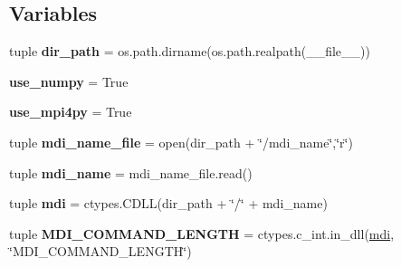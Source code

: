 \subsection*{Variables}
\begin{DoxyCompactItemize}
\item 
\hypertarget{namespacemolssi__driver__interface_1_1mdi_a659f7f2c2dad27268542893627dddd76}{tuple {\bfseries dir\-\_\-path} = os.\-path.\-dirname(os.\-path.\-realpath(\-\_\-\-\_\-file\-\_\-\-\_\-))}\label{namespacemolssi__driver__interface_1_1mdi_a659f7f2c2dad27268542893627dddd76}

\item 
\hypertarget{namespacemolssi__driver__interface_1_1mdi_ab641655ae2e8ddbbf84bea8e8e5bf953}{{\bfseries use\-\_\-numpy} = True}\label{namespacemolssi__driver__interface_1_1mdi_ab641655ae2e8ddbbf84bea8e8e5bf953}

\item 
\hypertarget{namespacemolssi__driver__interface_1_1mdi_a2d2043c182591fed4963dbcb9cf30484}{{\bfseries use\-\_\-mpi4py} = True}\label{namespacemolssi__driver__interface_1_1mdi_a2d2043c182591fed4963dbcb9cf30484}

\item 
\hypertarget{namespacemolssi__driver__interface_1_1mdi_ab47fd48619ba8e2bfe10f6d86d5be1b5}{tuple {\bfseries mdi\-\_\-name\-\_\-file} = open(dir\-\_\-path + \char`\"{}/mdi\-\_\-name\char`\"{},\char`\"{}r\char`\"{})}\label{namespacemolssi__driver__interface_1_1mdi_ab47fd48619ba8e2bfe10f6d86d5be1b5}

\item 
\hypertarget{namespacemolssi__driver__interface_1_1mdi_afc7bde19c202368b68fce956fdbc9035}{tuple {\bfseries mdi\-\_\-name} = mdi\-\_\-name\-\_\-file.\-read()}\label{namespacemolssi__driver__interface_1_1mdi_afc7bde19c202368b68fce956fdbc9035}

\item 
\hypertarget{namespacemolssi__driver__interface_1_1mdi_a57cb628499747477003d54de706ab429}{tuple {\bfseries mdi} = ctypes.\-C\-D\-L\-L(dir\-\_\-path + \char`\"{}/\char`\"{} + mdi\-\_\-name)}\label{namespacemolssi__driver__interface_1_1mdi_a57cb628499747477003d54de706ab429}

\item 
\hypertarget{namespacemolssi__driver__interface_1_1mdi_aa92fd47513f406f91b87c70b9dd221c6}{tuple {\bfseries M\-D\-I\-\_\-\-C\-O\-M\-M\-A\-N\-D\-\_\-\-L\-E\-N\-G\-T\-H} = ctypes.\-c\-\_\-int.\-in\-\_\-dll(\hyperlink{classmdi}{mdi}, \char`\"{}M\-D\-I\-\_\-\-C\-O\-M\-M\-A\-N\-D\-\_\-\-L\-E\-N\-G\-T\-H\char`\"{})}\label{namespacemolssi__driver__interface_1_1mdi_aa92fd47513f406f91b87c70b9dd221c6}


\end{DoxyCompactItemize}
